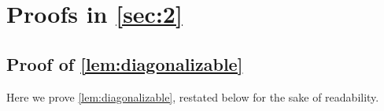 \documentclass{article}
\theoremstyle{plain}
\theoremstyle{definition}
\theoremstyle{remark}
\begin{document}
\newpage
\appendix
\onecolumn

\section{Proofs in \cref{sec:2}}
\label{sec:a}

\subsection{Proof of \cref{lem:diagonalizable}}
\label{sec:diagonalizable}

Here we prove \cref{lem:diagonalizable}, restated below for the sake of readability.

\lemdiagonalizable*
\end{document}
